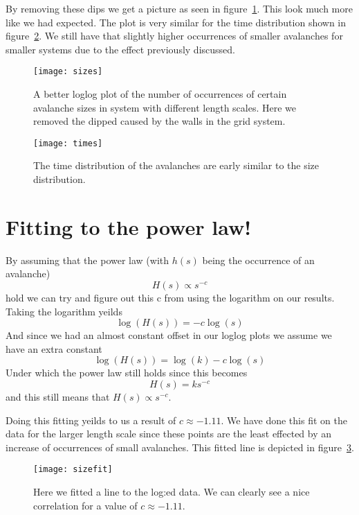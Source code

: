 \documentclass[11pt]{article}
\begin{document}
By removing these dips we get a picture as seen in figure~\ref{fig:sizes}. This look much more like we had expected. The plot is very similar for the time distribution shown in figure~\ref{fig:times}. We still have that slightly higher occurrences of smaller avalanches for smaller systems due to the effect previously discussed. 
\begin{figure}[H]
        \centering
        \texttt{[image: sizes]}
        \caption{A better loglog plot of the number of occurrences of certain avalanche sizes in system with different length scales. Here we removed the dipped caused by the walls in the grid system.}
        \label{fig:sizes}
\end{figure}
\begin{figure}[H]
        \centering
        \texttt{[image: times]}
        \caption{The time distribution of the avalanches are early similar to the size distribution.}
        \label{fig:times}
\end{figure}

\section{Fitting to the power law!}
By assuming that the power law (with $h(s)$ being the occurrence of an avalanche)
\begin{equation}
	H(s) \propto s^{-c}
\end{equation}
hold we can try and figure out this c from using the logarithm on our results. Taking the logarithm yeilds
\begin{equation}
	\log{(H(s))} = -c\log{(s)}
\end{equation}
And since we had an almost constant offset in our loglog plots we assume we have an extra constant
\begin{equation}
	\log{(H(s))} = \log{(k)} -c\log{(s)}
\end{equation}
Under which the power law still holds since this becomes
\begin{equation}
	H(s) = ks^{-c}
\end{equation}
and this still means that $H(s) \propto s^{-c}$.

Doing this fitting yeilds to us a result of $c\approx -1.11$. We have done this fit on the data for the larger length scale since these points are the least effected by an increase of occurrences of small avalanches. This fitted line is depicted in figure~\ref{fig:sizefit}.
\begin{figure}[H]
        \centering
        \texttt{[image: sizefit]}
        \caption{Here we fitted a line to the log:ed data. We can clearly see a nice correlation for a value of $c\approx -1.11$.}
        \label{fig:sizefit}
\end{figure}
\end{document}
